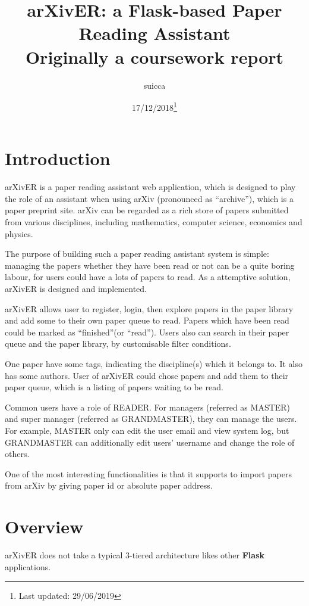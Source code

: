 \documentclass[letterpaper,12pt]{article}
\begin{document}
	\title{\textbf{arXivER: a Flask-based Paper Reading Assistant}\\{\small Originally a coursework report}}
	\author{suicca}
	\date{17/12/2018\footnote{Last updated: 29/06/2019}}
	\maketitle

	\section{Introduction}
    arXivER is a paper reading assistant web application, which is designed to play the role of an assistant when using arXiv\cite{arXiv} (pronounced as ``archive''), which is a paper preprint site. arXiv can be regarded as a rich store of papers submitted from various disciplines, including mathematics, computer science, economics and physics.
    
	The purpose of building such a paper reading assistant system is simple: managing the papers whether they have been read or not can be a quite boring labour, for users could have a lots of papers to read. As a attemptive solution, arXivER is designed and implemented.
    
    arXivER allows user to register, login, then explore papers in the paper library and add some to their own paper queue to read. Papers which have been read could be marked as ``finished''(or ``read''). Users also can search in their paper queue and the paper library, by customisable filter conditions.
    
    One paper have some tags, indicating the discipline(s) which it belongs to. It also has some authors. User of arXivER could chose papers and add them to their paper queue, which is a listing of papers waiting to be read.
     
    Common users have a role of READER. For managers (referred as MASTER) and super manager (referred as GRANDMASTER), they can manage the users. For example, MASTER only can edit the user email and view system log, but GRANDMASTER can additionally edit users' username and change the role of others.
    
    One of the most interesting functionalities is that it supports to import papers from arXiv by giving paper id or absolute paper address.
    
    \section{Overview}
    arXivER does not take a typical 3-tiered architecture likes other \textbf{Flask} applications.
    
\end{document}
